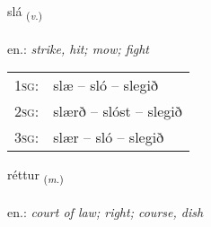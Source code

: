 \documentclass[frontgrid, backgrid]{flacards}\usepackage[]{graphicx}\usepackage[]{xcolor}
\begin{document}
\renewcommand{\flhead}{\vskip5pt \fboxsep=0pt {\small\bfseries\footnotesize Sagnorð | Verb}}
\renewcommand{\fcfoot}{\vskip5pt \fboxsep=0pt \hspace{2pt}{\small\bfseries\footnotesize 1K}}

\renewcommand{\blhead}{\vskip5pt {\small\bfseries\footnotesize Sagnorð | Verb }}
\renewcommand{\bcfoot}{\vskip5pt \hspace{2pt}{\small\bfseries\footnotesize 1K}}


{slá \small{\textsubscript{(\textit{v.})}} \\[1ex] %
\textphonetic{[stlauː]} \\
en.: \emph{strike, hit; mow; fight} \\  [2ex]
\renewcommand*{\arraystretch}{0.8}
\begin{tabular}{p{1cm}l}
\textsc{1sg}: & slæ -- sló -- slegið \\ 
\textsc{2sg}: & slærð -- slóst -- slegið \\ 
\textsc{3sg}: & slær -- sló -- slegið \\ 
\end{tabular}
}

\renewcommand{\flhead}{\vskip5pt \fboxsep=0pt {\small\bfseries\footnotesize Nafnorð | Noun}}
\renewcommand{\fcfoot}{\vskip5pt \fboxsep=0pt \hspace{2pt}{\small\bfseries\footnotesize 1K}}

\renewcommand{\blhead}{\vskip5pt {\small\bfseries\footnotesize Nafnorð | Noun }}
\renewcommand{\bcfoot}{\vskip5pt \hspace{2pt}{\small\bfseries\footnotesize 1K}}


{réttur \small{\textsubscript{(\textit{m.})}} \\[1ex] %
\textphonetic{[rjɛhtʏr]} \\
en.: \emph{court of law; right; course, dish} \\  [2ex]
\renewcommand*{\arraystretch}{0.8}
}
\end{document}

